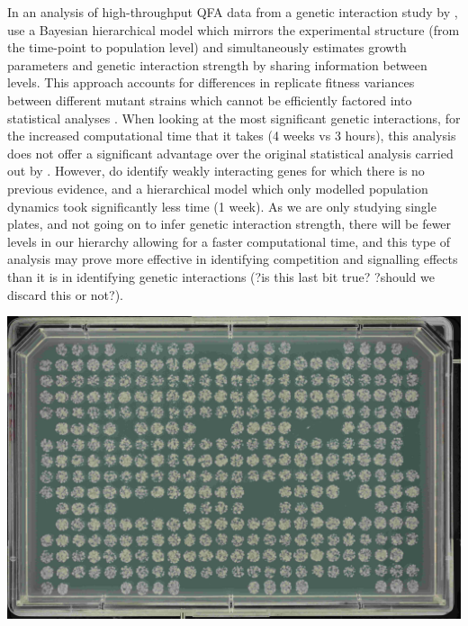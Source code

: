 In an analysis of high-throughput QFA data from a genetic interaction
study by \citet{Addinall2011}, \citet{Heydari2016} use a Bayesian
hierarchical model which mirrors the experimental structure (from the
time-point to population level) and simultaneously estimates growth
parameters and genetic interaction strength by sharing information
between levels. This approach accounts for differences in replicate
fitness variances between different mutant strains which cannot be
efficiently factored into statistical analyses
\citep{Heydari2016}. When looking at the most significant genetic
interactions, for the increased computational time that it takes (4
weeks vs 3 hours), this analysis does not offer a significant
advantage over the original statistical analysis carried out by
\citet{Addinall2011}. However, \citet{Heydari2016} do identify weakly
interacting genes for which there is no previous evidence, and a
hierarchical model which only modelled population dynamics took
significantly less time (1 week). As we are only studying single
plates, and not going on to infer genetic interaction strength, there
will be fewer levels in our hierarchy allowing for a faster
computational time, and this type of analysis may prove more effective in
identifying competition and signalling effects than it is in identifying genetic
interactions (?is this last bit true? ?should we discard this or
not?).

\begin{Figure}
  \centering
  \includegraphics[width=\linewidth]{DLR00012647-2009-07-02_23-12-49}
  \label{fig:gaps}
\end{Figure}

